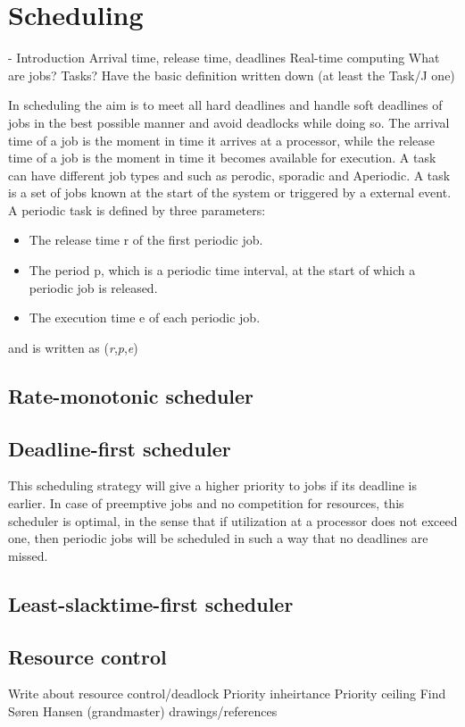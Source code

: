 \section{Scheduling} \label{sc:scheduling}

- Introduction
Arrival time, release time, deadlines
Real-time computing
What are jobs? Tasks?
Have the basic definition written down (at least the Task/J one)


In scheduling the aim is to meet all hard deadlines and handle soft deadlines of jobs in the best possible manner and avoid deadlocks while doing so. The arrival time of a job is the moment in time it arrives at a processor, while the
release time of a job is the moment in time it becomes available for execution. A task can have different job types and such as perodic, sporadic and Aperiodic. A task is a set of jobs known at the start of the system or triggered by a external event.
A periodic task is defined by three parameters:
\begin{itemize}
	\item The release time r of the first periodic job.
	\item The period p, which is a periodic time interval, at the start of which a periodic job is released.
	\item The execution time e of each periodic job.
\end{itemize}
and is written as (\textit{r},\textit{p},\textit{e})

\subsection{Rate-monotonic scheduler}


\subsection{Deadline-first scheduler}
This scheduling strategy will give a higher priority to jobs if its deadline is
earlier. In case of preemptive jobs and no competition for resources, this scheduler
is optimal, in the sense that if utilization at a processor does not exceed one, then
periodic jobs will be scheduled in such a way that no deadlines are missed.


\subsection{Least-slacktime-first scheduler}


\subsection{Resource control}
Write about resource control/deadlock
Priority inheirtance
Priority ceiling
Find Søren Hansen (grandmaster) drawings/references